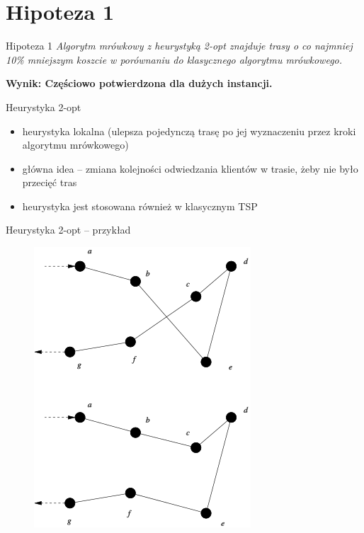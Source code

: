 \documentclass{beamer}
\begin{document}
\section*{Hipoteza 1}
\begin{frame}{Hipoteza 1}
    \textit{Algorytm mrówkowy z heurystyką 2-opt znajduje trasy o co najmniej 10\% mniejszym koszcie w porównaniu do klasycznego algorytmu mrówkowego.}
    \vspace{1em}

    \textbf{Wynik: Częściowo potwierdzona dla dużych instancji.} 
\end{frame}

\begin{frame}{Heurystyka 2-opt}
    \begin{itemize}
        \setlength\itemsep{1em}
        \item heurystyka lokalna (ulepsza pojedynczą trasę po jej wyznaczeniu przez kroki algorytmu mrówkowego)
        \item główna idea -- zmiana kolejności odwiedzania klientów w trasie, żeby nie było przecięć tras
        \item heurystyka jest stosowana również w klasycznym TSP
    \end{itemize}
\end{frame}

\begin{frame}{Heurystyka 2-opt -- przykład}
    \begin{figure}
        \centering
        \includegraphics[width=0.5\linewidth]{img/2-opt_wiki.png}
    \end{figure}        
\end{frame}
\end{document}
